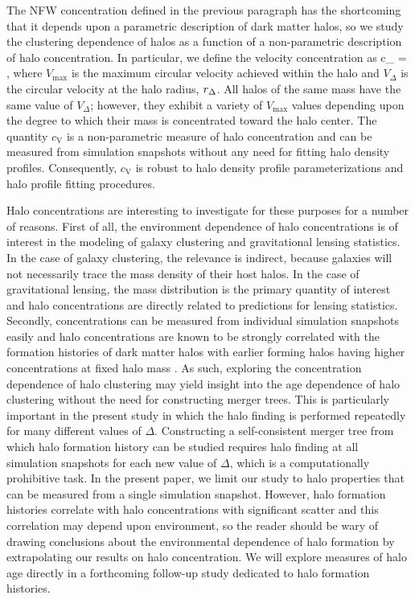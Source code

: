\documentclass[usenatbib]{mnras}
\begin{document}
The NFW concentration defined in the previous paragraph has the shortcoming that it 
depends upon a parametric description of dark matter halos, so we study the clustering dependence 
of halos as a function of a non-parametric description of halo concentration. In particular, we 
define the velocity concentration as 
\beq
c_{} = , 
\eeq
where $V_{\mathrm{max}}$ is the maximum circular velocity achieved within the halo and $V_{\Delta}$ is 
the circular velocity at the halo radius, $r_{\Delta}$. All halos of the same mass have the same value of $V_{\Delta}$; however, 
they exhibit a variety of $V_{\mathrm{max}}$ values depending upon the degree to which their mass is concentrated toward 
the halo center. The quantity $c_{\mathrm{V}}$ is a non-parametric measure of halo concentration and can be measured from 
simulation snapshots without any need for fitting halo density profiles. Consequently, $c_{\mathrm{V}}$ is robust to halo density 
profile parameterizations and halo profile fitting procedures. 


Halo concentrations are interesting to investigate for these purposes for a number of reasons. 
First of all, the environment dependence of halo concentrations is of interest in the modeling of 
galaxy clustering and gravitational lensing statistics. In the case of galaxy clustering, the relevance 
is indirect, because galaxies will not necessarily trace the mass density of their host halos. In the case 
of gravitational lensing, the mass distribution is the primary quantity of interest and halo concentrations are 
directly related to predictions for lensing statistics. Secondly, concentrations can be measured from 
individual simulation snapshots easily and halo concentrations are known to be strongly correlated with 
the formation histories of dark matter halos with earlier forming halos having higher concentrations at 
fixed halo mass \citep{wechsler_etal02, wechsler_etal06} 
. As such, exploring the concentration dependence of halo
clustering may yield insight into the age dependence of halo clustering without the need for constructing merger
trees. This is particularly important in the present study in which the halo finding is performed repeatedly for many 
different values of $\Delta$. Constructing a self-consistent merger tree from which halo formation history can be 
studied requires halo finding at all simulation snapshots for each new value of $\Delta$, which is a computationally 
prohibitive task. In the present paper, we limit our study to halo properties that can be measured from a single simulation 
snapshot. However, halo formation histories correlate with halo concentrations with significant scatter and this correlation may 
depend upon environment, so the reader should be wary of drawing conclusions about the environmental dependence of 
halo formation by extrapolating our results on halo concentration. 
We will explore measures of halo age directly in a forthcoming follow-up study dedicated to halo 
formation histories.
\end{document}
